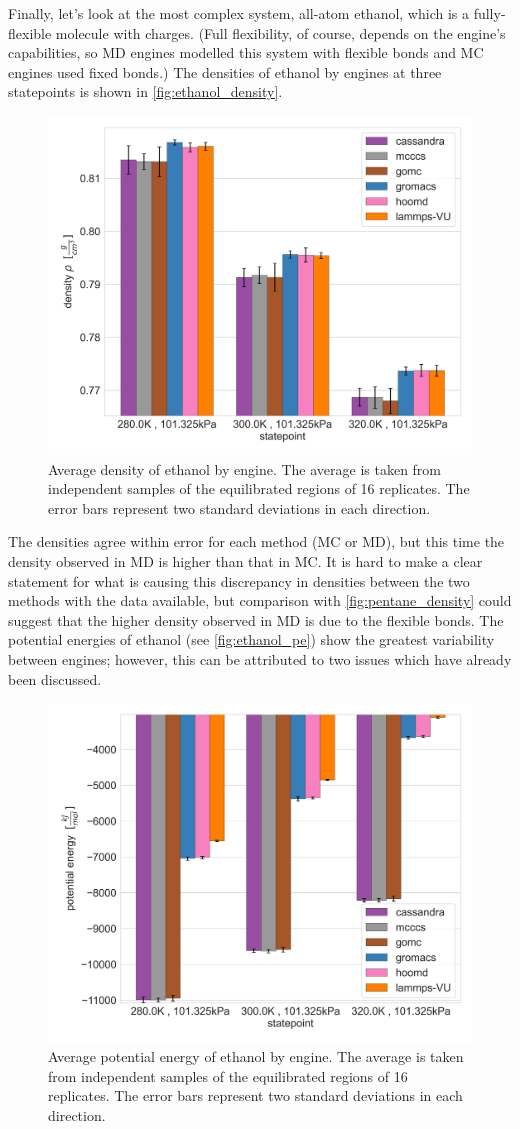 Finally, let's look at the most complex system, all-atom ethanol, which is a fully-flexible molecule with charges.
(Full flexibility, of course, depends on the engine's capabilities, so MD engines modelled this system with flexible bonds and MC engines used fixed bonds.)
The densities of ethanol by engines at three statepoints is shown in \autoref{fig:ethanol_density}.
\begin{figure}[h!]
    \centering
    \includegraphics[width=0.6\linewidth,keepaspectratio]{figures/rep_study/ethanolAA_summary.png}
    \caption{Average density of ethanol by engine. The average is taken from independent samples of the equilibrated regions of 16 replicates. The error bars represent two standard deviations in each direction.}\label{fig:ethanol_density}
\end{figure}
The densities agree within error for each method (MC or MD), but this time the density observed in MD is higher than that in MC.
It is hard to make a clear statement for what is causing this discrepancy in densities between the two methods with the data available, but comparison with \autoref{fig:pentane_density} could suggest that the higher density observed in MD is due to the flexible bonds.
The potential energies of ethanol (see \autoref{fig:ethanol_pe}) show the greatest variability between engines; however, this can be attributed to two issues which have already been discussed.
\begin{figure}[h!]
    \centering
    \includegraphics[width=0.6\linewidth,keepaspectratio]{figures/rep_study/ethanolAA_pe_summary.png}
    \caption{Average potential energy of ethanol by engine. The average is taken from independent samples of the equilibrated regions of 16 replicates. The error bars represent two standard deviations in each direction.}\label{fig:ethanol_pe}
\end{figure}
